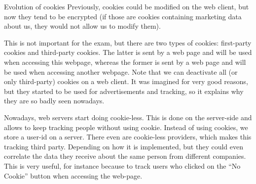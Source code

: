\documentclass[a4paper]{article}
\begin{document}
\begin{parag}{Evolution of cookies}
    Previously, cookies could be modified on the web client, but now they tend to be encrypted (if those are cookies containing marketing data about us, they would not allow us to modify them).

    This is not important for the exam, but there are two types of cookies: first-party cookies and third-party cookies. The latter is sent by a web page and will be used when accessing this webpage, whereas the former is sent by a web page and will be used when accessing another webpage. Note that we can deactivate all (or only third-party) cookies on a web client. It was imagined for very good reasons, but they started to be used for advertisements and tracking, so it explains why they are so badly seen nowadays.

    Nowadays, web servers start doing cookie-less. This is done on the server-side and allows to keep tracking people without using cookie. Instead of using cookies, we store a user-id on a server. There even are cookie-less providers, which makes this tracking third party. Depending on how it is implemented, but they could even correlate the data they receive about the same person from different companies. This is very useful, for instance because to track users who clicked on the ``No Cookie'' button when accessing the web-page.
\end{parag}
\end{document}

